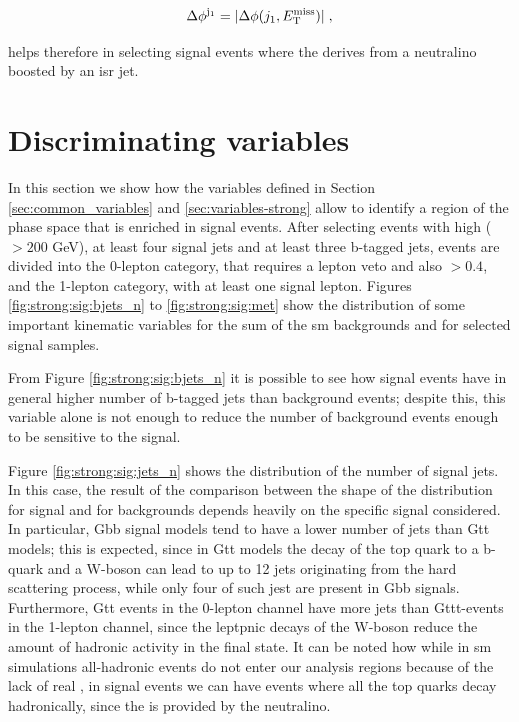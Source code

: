 \begin{equation}
{\Delta}\phi^{\mathrm{j}_1} = |{\Delta}{\phi}(j_1, E_{\rm T}^{\mathrm{miss}})| \; ,
\end{equation}

\noindent helps therefore in selecting signal events where the \met derives from a neutralino boosted by an \gls{isr} jet. 


\section{Discriminating variables}
\label{sec:strong:sigbkg}

In this section we show how the variables defined in Section \ref{sec:common_variables} and \ref{sec:variables-strong} allow to 
identify a region of the phase space that is enriched in signal events. 
After selecting events with high \met ($> 200$ GeV), at least four signal jets and at least three b-tagged jets, events are
divided into the 0-lepton category, that requires a lepton veto and also \dphimin $>0.4$, and the 1-lepton category, 
with at least one signal lepton.
Figures \ref{fig:strong:sig:bjets_n} to \ref{fig:strong:sig:met} show the distribution of some important kinematic variables for 
the sum of the \gls{sm} backgrounds and for selected signal samples. 

From Figure \ref{fig:strong:sig:bjets_n} it is possible to see how signal events have in general higher number of 
b-tagged jets than background events; despite this, this variable alone is not enough to reduce the number of 
background events enough to be sensitive to the signal.

Figure \ref{fig:strong:sig:jets_n} shows the distribution of the number of signal jets. 
In this case, the result of the comparison between the shape of the distribution for signal and for backgrounds depends heavily 
on the specific signal considered. In particular, Gbb signal models tend to have a lower number of jets than Gtt models; 
this is expected, since in Gtt models the decay of the top quark to a b-quark and a W-boson can lead to up to 12 jets originating from the 
hard scattering process, while only four of such jest are present in Gbb signals. 
Furthermore, Gtt events in the 0-lepton channel have more jets than Gttt-events in the 1-lepton channel, since the leptpnic decays of the W-boson 
reduce the amount of hadronic activity in the final state. 
It can be noted how while in \gls{sm} simulations all-hadronic \ttbar events do not enter our analysis regions because of the lack of real \met,  in signal events we can have events where all the top quarks decay hadronically, since the \met is provided by the neutralino. 


